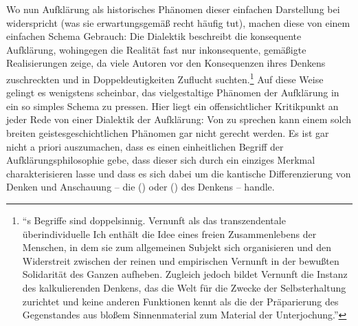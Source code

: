 Wo nun Aufklärung als historisches Phänomen dieser einfachen Darstellung bei
 widerspricht (was sie
erwartungsgemäß recht häufig tut), machen diese von einem einfachen Schema Gebrauch: Die Dialektik beschreibt die konsequente Aufklärung,
wohingegen die Realität fast nur inkonsequente, gemäßigte Realisierungen zeige,
da viele Autoren vor den Konsequenzen ihres Denkens zuschreckten und in
Doppeldeutigkeiten Zuflucht
suchten.\footnote{\cite[Vgl.
z.\,B.][\pno~102f.:]{Horkheimer:DialektikderAufklaerung1997}
\enquote{s Begriffe sind doppelsinnig. Vernunft als das
transzendentale überindividuelle Ich enthält die Idee eines freien
Zusammenlebens der Menschen, in dem sie zum allgemeinen Subjekt sich
organisieren und den Widerstreit zwischen der reinen und empirischen Vernunft in
der bewußten Solidarität des Ganzen aufheben. {\punkt} Zugleich jedoch bildet
Vernunft die Instanz des kalkulierenden Denkens, das die Welt für die Zwecke der
Selbsterhaltung zurichtet und keine anderen Funktionen kennt als die der
Präparierung des Gegenstandes aus bloßem Sinnenmaterial zum Material der
Unterjochung.}} Auf diese Weise gelingt es wenigstens scheinbar, das
vielgestaltige Phänomen der Aufklärung in ein so simples Schema zu pressen. Hier
liegt ein offensichtlicher Kritikpunkt an jeder Rede von einer Dialektik der
Aufklärung: Von  zu sprechen kann
einem solch breiten geistesgeschichtlichen Phänomen gar nicht gerecht werden. Es
ist gar nicht a priori auszumachen, dass es einen einheitlichen Begriff der
Aufklärungsphilosophie gebe, dass dieser sich durch ein einziges Merkmal
charakterisieren lasse und dass es sich dabei um die kantische Differenzierung von Denken und Anschauung -- die
 () oder 
() des Denkens -- handle.

